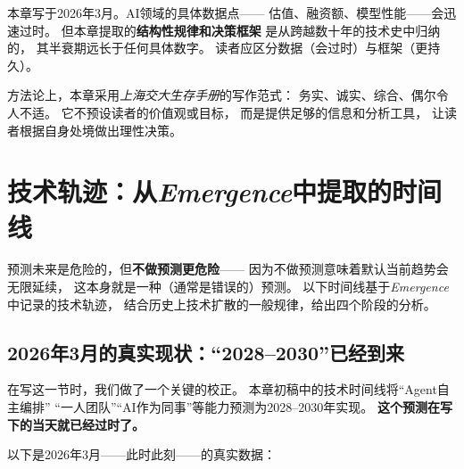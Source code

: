 \begin{warnbox}[关于时效性的声明]
本章写于2026年3月。AI领域的具体数据点——
估值、融资额、模型性能——会迅速过时。
但本章提取的\textbf{结构性规律和决策框架}
是从跨越数十年的技术史中归纳的，
其半衰期远长于任何具体数字。
读者应区分数据（会过时）与框架（更持久）。
\end{warnbox}

方法论上，本章采用\textit{上海交大生存手册}的写作范式：
务实、诚实、综合、偶尔令人不适。
它不预设读者的价值观或目标，
而是提供足够的信息和分析工具，
让读者根据自身处境做出理性决策。


\section{技术轨迹：从\textit{Emergence}中提取的时间线}
\label{sec:fg-tech-timeline}

预测未来是危险的，但\textbf{不做预测更危险}——
因为不做预测意味着默认当前趋势会无限延续，
这本身就是一种（通常是错误的）预测。
以下时间线基于\textit{Emergence}中记录的技术轨迹，
结合历史上技术扩散的一般规律，给出四个阶段的分析。

\subsection{2026年3月的真实现状：``2028--2030''已经到来}

在写这一节时，我们做了一个关键的校正。
本章初稿中的技术时间线将``Agent自主编排''
``一人团队''``AI作为同事''等能力预测为2028--2030年实现。
\textbf{这个预测在写下的当天就已经过时了。}

以下是2026年3月——此时此刻——的真实数据：

